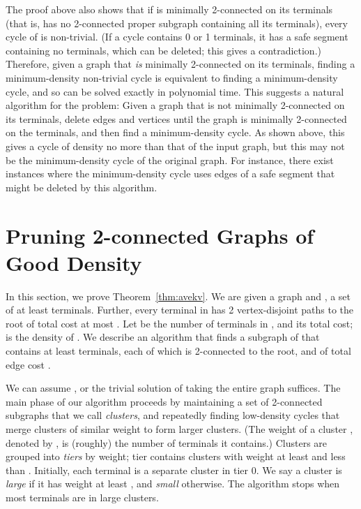 \documentclass[11pt]{article}
\begin{document}
The proof above also shows that if  is minimally 2-connected on its
terminals (that is,  has no 2-connected proper subgraph containing
all its terminals), every cycle of  is non-trivial. (If a cycle
contains 0 or 1 terminals, it has a safe segment containing no
terminals, which can be deleted; this gives a contradiction.)
Therefore, given a graph that \emph{is} minimally 2-connected on its
terminals, finding a minimum-density non-trivial cycle is equivalent
to finding a minimum-density cycle, and so can be solved exactly in
polynomial time.  This suggests a natural algorithm for the problem:
Given a graph that is not minimally 2-connected on its terminals,
delete edges and vertices until the graph is minimally 2-connected on
the terminals, and then find a minimum-density cycle. As shown above,
this gives a cycle of density no more than that of the input graph,
but this may not be the minimum-density cycle of the original
graph. For instance, there exist instances where the minimum-density
cycle uses edges of a safe segment  that might be deleted by this
algorithm.


\section{Pruning 2-connected Graphs of Good Density}
\label{sec:pruning}

In this section, we prove Theorem~\ref{thm:avekv}. We are given a
graph  and , a set of at least  terminals.
Further, every terminal in  has 2 vertex-disjoint paths to the root
 of total cost at most . Let  be the number of terminals
in , and  its total cost;  is
the density of . We describe an algorithm that finds a subgraph 
of  that contains at least  terminals, each of which is
2-connected to the root, and of total edge cost .

We can assume , or the trivial solution of
taking the entire graph  suffices. The main phase of our algorithm
proceeds by maintaining a set of 2-connected subgraphs that we call
\emph{clusters}, and repeatedly finding low-density cycles that merge
clusters of similar weight to form larger clusters.  (The weight of a
cluster , denoted by , is (roughly) the number of terminals it
contains.) Clusters are grouped into \emph{tiers} by weight; tier 
contains clusters with weight at least  and less than
. Initially, each terminal is a separate cluster in tier
0. We say a cluster is \emph{large} if it has weight at least , and
\emph{small} otherwise. The algorithm stops when most terminals are in
large clusters.
\end{document}
